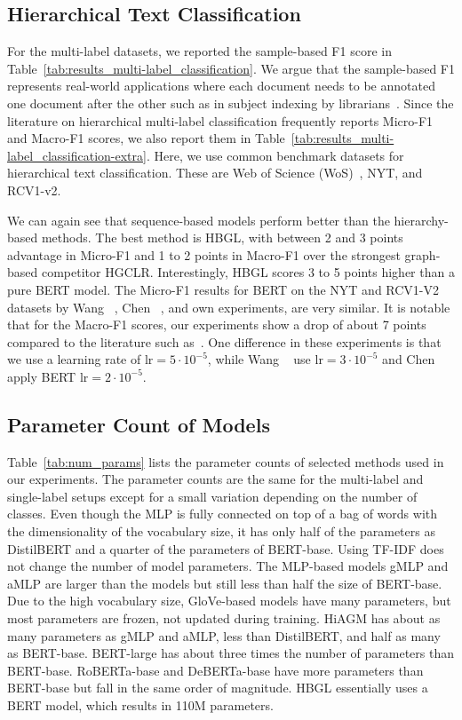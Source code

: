 \subsection{Hierarchical Text Classification}
For the multi-label datasets, we reported the sample-based F1 score in
Table~\ref{tab:results_multi-label_classification}.  
We argue that the
sample-based F1 represents real-world applications where each document needs to
be annotated one document after the other such as in subject
indexing by librarians~\cite{DBLP:conf/kcap/GalkeMSBS17,DBLP:conf/jcdl/MaiGS18}.  
Since the
literature on hierarchical multi-label classification frequently reports Micro-F1
and Macro-F1 scores, we also report them in
Table~\ref{tab:results_multi-label_classification-extra}.
Here, we use common benchmark datasets for hierarchical text classification.
These are 
Web of Science (WoS)~\cite{DBLP:conf/icmla/KowsariBHMGB17}, NYT, and RCV1-v2.

We can again see that sequence-based models perform better than the
hierarchy-based methods.  The best method is HBGL, with between 2 and 3 points
advantage in Micro-F1 and 1 to 2 points in Macro-F1 over the strongest
graph-based competitor HGCLR.  Interestingly, HBGL scores 3 to 5 points higher
than a pure BERT model.
The Micro-F1 results for BERT on the NYT and RCV1-V2
datasets by Wang \etal~\cite{DBLP:conf/acl/WangWH0W22},
Chen \etal~\cite{DBLP:conf/acl/ChenMLY20}, and own experiments, are very similar.  
It is notable that for the Macro-F1 scores, our experiments show a drop of about 7
points compared to the literature such as~\cite{DBLP:conf/acl/WangWH0W22,DBLP:conf/acl/ChenMLY20}.  
One difference in these experiments is that we
use a learning rate of $\mathrm{lr}=5 \cdot 10^{-5} $, while Wang \etal~\cite{DBLP:conf/acl/WangWH0W22} use $\mathrm{lr}=3 \cdot 10^{-5}$ and
Chen \etal~\cite{DBLP:conf/acl/ChenMLY20} apply BERT $\mathrm{lr}=2 \cdot 10^{-5}$.

\subsection{Parameter Count of Models}
Table~\ref{tab:num_params} lists the parameter counts of selected methods used in our experiments. 
The parameter counts are the same for the multi-label and single-label setups except for a small variation depending on the number of classes. 
Even though the MLP is fully connected on top of a bag of words with the dimensionality of the vocabulary size, it has only half of the parameters as DistilBERT and a quarter of the parameters of BERT-base. 
Using TF-IDF does not change the number of model parameters. 
The MLP-based models gMLP and aMLP are larger than the \mlp models but still less than half the size of BERT-base.
Due to the high vocabulary size, GloVe-based models have many parameters, but most parameters are frozen, \ie not updated during training.
HiAGM has about as many parameters as gMLP and aMLP, less than DistilBERT, and half as many as BERT-base.
BERT-large has about three times the number of parameters than BERT-base.
RoBERTa-base and DeBERTa-base have more parameters than BERT-base but fall in the same order of magnitude.
HBGL essentially uses a BERT model, which results in 110M parameters.

